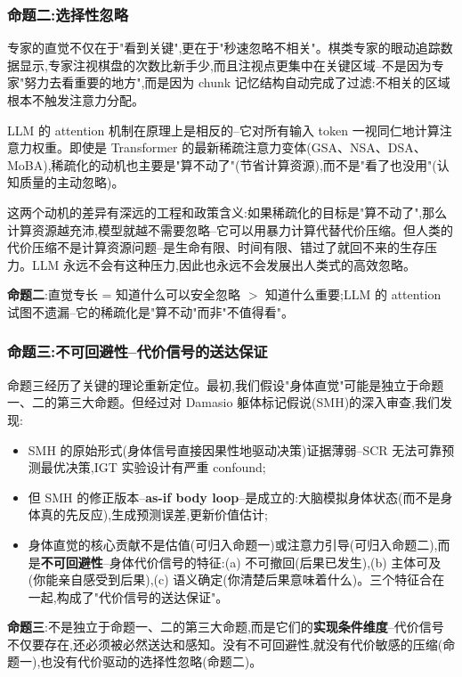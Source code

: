 \documentclass[11pt,a4paper]{article}
\begin{document}
\subsubsection{命题二:选择性忽略}

专家的直觉不仅在于"看到关键",更在于"秒速忽略不相关"。棋类专家的眼动追踪数据显示,专家注视棋盘的次数比新手少,而且注视点更集中在关键区域\cite{eyetrackingchess}--不是因为专家"努力去看重要的地方",而是因为 chunk 记忆结构自动完成了过滤:不相关的区域根本不触发注意力分配。

LLM 的 attention 机制在原理上是相反的--它对所有输入 token 一视同仁地计算注意力权重。即使是 Transformer 的最新稀疏注意力变体(GSA、NSA、DSA、MoBA)\cite{gsa2025},稀疏化的动机也主要是"算不动了"(节省计算资源),而不是"看了也没用"(认知质量的主动忽略)。

这两个动机的差异有深远的工程和政策含义:如果稀疏化的目标是"算不动了",那么计算资源越充沛,模型就越不需要忽略--它可以用暴力计算代替代价压缩。但人类的代价压缩不是计算资源问题--是生命有限、时间有限、错过了就回不来的生存压力。LLM 永远不会有这种压力,因此也永远不会发展出人类式的高效忽略。

\textbf{命题二}:直觉专长 = 知道什么可以安全忽略 $>$ 知道什么重要;LLM 的 attention 试图不遗漏--它的稀疏化是"算不动"而非"不值得看"。

\subsubsection{命题三:不可回避性--代价信号的送达保证}

命题三经历了关键的理论重新定位。最初,我们假设"身体直觉"可能是独立于命题一、二的第三大命题。但经过对 Damasio 躯体标记假说(SMH)的深入审查,我们发现:

\begin{itemize}
  \item SMH 的原始形式(身体信号直接因果性地驱动决策)证据薄弱--SCR 无法可靠预测最优决策,IGT 实验设计有严重 confound\cite{maia2004reexamination};
  \item 但 SMH 的修正版本--\textbf{as-if body loop}--是成立的:大脑模拟身体状态(而不是身体真的先反应),生成预测误差,更新价值估计\cite{seth2016active};
  \item 身体直觉的核心贡献不是估值(可归入命题一)或注意力引导(可归入命题二),而是\textbf{不可回避性}--身体代价信号的特征:(a) 不可撤回(后果已发生),(b) 主体可及(你能亲自感受到后果),(c) 语义确定(你清楚后果意味着什么)。三个特征合在一起,构成了"代价信号的送达保证"。
\end{itemize}

\textbf{命题三}:不是独立于命题一、二的第三大命题,而是它们的\textbf{实现条件维度}--代价信号不仅要存在,还必须被必然送达和感知。没有不可回避性,就没有代价敏感的压缩(命题一),也没有代价驱动的选择性忽略(命题二)。
\end{document}
